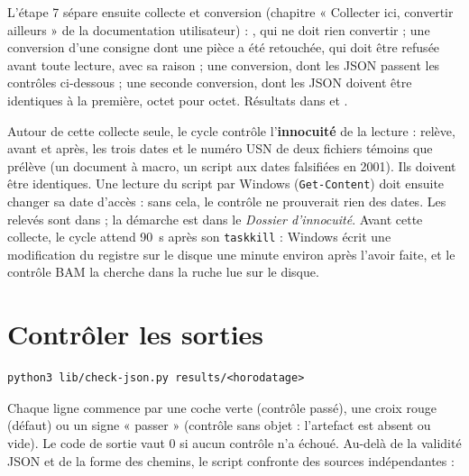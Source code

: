 \documentclass[11pt,a4paper,oneside]{report}
\begin{document}
L'étape 7 sépare ensuite collecte et conversion (chapitre « Collecter ici,
convertir ailleurs » de la documentation utilisateur) : 
 , qui ne doit rien convertir ; une conversion d'une
consigne dont une pièce a été retouchée, qui doit être refusée avant toute
lecture, avec sa raison ; une conversion, dont les JSON passent les contrôles
ci-dessous ; une seconde conversion, dont les JSON doivent être identiques à la
première, octet pour octet. Résultats dans  et
.

Autour de cette collecte seule, le cycle contrôle l'\textbf{innocuité} de la
lecture :  relève, avant et après, les trois
dates et le numéro USN de deux fichiers témoins que  prélève (un
document à macro, un script aux dates falsifiées en 2001). Ils doivent être
identiques. Une lecture du script par Windows (\texttt{Get-Content}) doit
ensuite changer sa date d'accès : sans cela, le contrôle ne prouverait rien des
dates. Les relevés sont dans  ; la démarche est dans
le \emph{Dossier d'innocuité}. Avant cette collecte, le cycle attend 90~s après
son \texttt{taskkill} : Windows écrit une modification du registre sur le
disque une minute environ après l'avoir faite, et le contrôle BAM la cherche
dans la ruche lue sur le disque.

\section{Contrôler les sorties}

\begin{lstlisting}
python3 lib/check-json.py results/<horodatage>
\end{lstlisting}

Chaque ligne commence par une coche verte (contrôle passé), une croix rouge
(défaut) ou un signe « passer » (contrôle sans objet : l'artefact est absent ou
vide). Le code de
sortie vaut 0 si aucun contrôle n'a échoué. Au-delà de la validité JSON et de la
forme des chemins, le script confronte des sources indépendantes :
\end{document}
